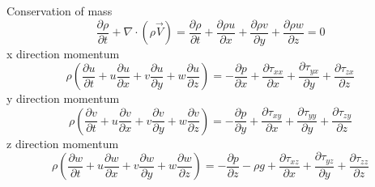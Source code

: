 \documentclass[class=report, crop=false, 12pt,a4paper]{standalone}
\begin{document}
Conservation of mass
\begin{equation}
  \frac{\partial \rho}{\partial t} + \nabla \cdot (\rho \overrightarrow{V}) = \frac{\partial \rho}{\partial t} + \frac{\partial \rho u}{\partial x} + \frac{\partial \rho v}{\partial y} + \frac{\partial \rho w}{\partial z} = 0
\end{equation}
x direction momentum
\begin{equation}
  \rho \left( \frac{\partial u}{\partial t} + u \frac{\partial u}{\partial x} + v \frac{\partial u}{\partial y} + w \frac{\partial u}{\partial z} \right) = -\frac{\partial p}{\partial x} + \frac{\partial \tau_{xx}}{\partial x} + \frac{\partial \tau_{yx}}{\partial y} + \frac{\partial \tau_{zx}}{\partial z}
\end{equation}
y direction momentum
\begin{equation}
  \rho \left( \frac{\partial v}{\partial t} + u \frac{\partial v}{\partial x} + v \frac{\partial v}{\partial y} + w \frac{\partial v}{\partial z} \right) = -\frac{\partial p}{\partial y} + \frac{\partial \tau_{xy}}{\partial x} + \frac{\partial \tau_{yy}}{\partial y} + \frac{\partial \tau_{zy}}{\partial z}
\end{equation}
z direction momentum
\begin{equation}
  \rho \left( \frac{\partial w}{\partial t} + u \frac{\partial w}{\partial x} + v \frac{\partial w}{\partial y} + w \frac{\partial w}{\partial z} \right) = -\frac{\partial p}{\partial z} -\rho g + \frac{\partial \tau_{xz}}{\partial x} + \frac{\partial \tau_{yz}}{\partial y} + \frac{\partial \tau_{zz}}{\partial z}
\end{equation}
\end{document}
